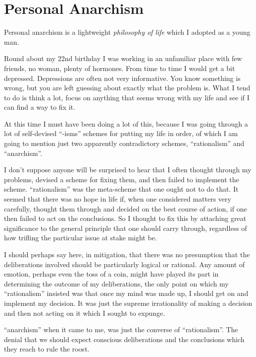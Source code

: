 \section{Personal Anarchism}\label{Personal}

Personal anarchism is a lightweight {\it philosophy of life} which I adopted as a young man.

Round about my 22nd birthday I was working in an unfamiliar place with few friends, no woman, plenty of hormones.
From time to time I would get a bit depressed.
Depressions are often not very informative.
You know something is wrong, but you are left guessing about exactly what the problem is.
What I tend to do is think a lot, focus on anything that seems wrong with my life and see if I can find a way to fix it.

At this time I must have been doing a lot of this, because I was going through a lot of self-devised ``-isms'' schemes for putting my life in order, of which I am going to mention just two apparently contradictory schemes, ``rationalism'' and ``anarchism''.

I don't suppose anyone will be surprised to hear that I often thought through my problems, devised a scheme for fixing them, and then failed to implement the scheme.
``rationalism'' was the meta-scheme that one ought not to do that.
It seemed that there was no hope in life if, when one considered matters very carefully, thought them through and decided on the best course of action, if one then failed to act on the conclusions.
So I thought to fix this by attaching great significance to the general principle that one should carry through, regardless of how trifling the particular issue at stake might be.

I should perhaps say here, in mitigation, that there was no presumption that the deliberations involved should be particularly logical or rational.
Any amount of emotion, perhaps even the toss of a coin, might have played its part in determining the outcome of my deliberations, the only point on which my ``rationalism'' insisted was that once my mind was made up, I should get on and implement my decision.
It was just the supreme irrationality of making a decision and then not acting on it which I sought to expunge.

``anarchism'' when it came to me, was just the converse of ``rationalism''.
The denial that we should expect conscious deliberations and the conclusions which they reach to rule the roost.

